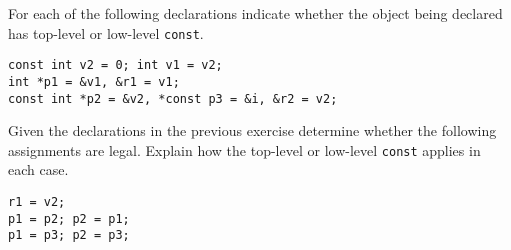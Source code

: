 %
%
\begin{question}
For each of the following declarations indicate whether the
object being declared has top-level or low-level \verb|const|.
\begin{lstlisting}
const int v2 = 0; int v1 = v2;
int *p1 = &v1, &r1 = v1;
const int *p2 = &v2, *const p3 = &i, &r2 = v2;
\end{lstlisting}
\end{question}

\begin{question}
Given the declarations in the previous exercise determine
whether the following assignments are legal. Explain how the top-level or
low-level \verb|const| applies in each case.
\begin{lstlisting}
r1 = v2;
p1 = p2; p2 = p1;
p1 = p3; p2 = p3;
\end{lstlisting}
\end{question}
